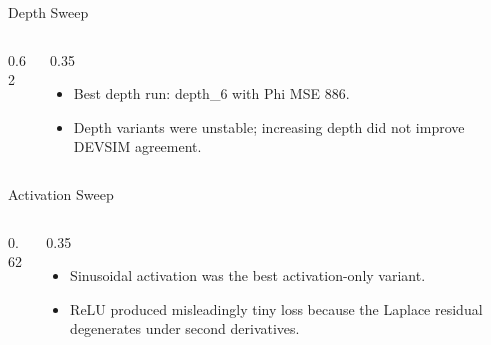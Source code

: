 \documentclass[aspectratio=169,professionalfonts]{beamer}
\begin{document}
\begin{frame}[t]{Depth Sweep}
\begin{columns}[T,onlytextwidth]
\begin{column}{0.62\textwidth}
\scriptsize
{}
\end{column}
\begin{column}{0.35\textwidth}
\begin{itemize}
  \item Best depth run: depth\_6 with Phi MSE 886.
  \item Depth variants were unstable; increasing depth did not improve DEVSIM agreement.
\end{itemize}
\end{column}
\end{columns}
\end{frame}

\begin{frame}[t]{Activation Sweep}
\begin{columns}[T,onlytextwidth]
\begin{column}{0.62\textwidth}
\scriptsize
{}
\end{column}
\begin{column}{0.35\textwidth}
\begin{itemize}
  \item Sinusoidal activation was the best activation-only variant.
  \item ReLU produced misleadingly tiny loss because the Laplace residual degenerates under second derivatives.
\end{itemize}
\end{column}
\end{columns}
\end{frame}
\end{document}
